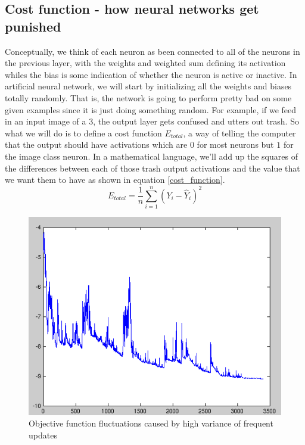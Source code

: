 \documentclass[master]{thesis-uestc}
\begin{document}
\subsection{Cost function - how neural networks get punished}
Conceptually, we think of each neuron as been connected to all of the neurons in the previous layer, with the weights and weighted sum defining its activation whiles the bias is some indication of whether the neuron is active or inactive. In artificial neural network, we will start by initializing all the weights and biases totally randomly. That is, the network is going to perform pretty bad on some given examples since it is just doing something random. For example, if we feed in an input image of a $3$, the output layer gets confused and utters out trash. So what we will do is to define a cost function $E_{total}$, a way of telling the computer that the output should have activations which are $0$ for most neurons but $1$ for the image class neuron. In a mathematical language, we'll add up the squares of the differences between each of those trash output activations and the value that we want them to have as shown in equation \ref{cost_function}.
\begin{equation}
    E_{total} = \frac{1}{n}\sum_{i=1}^{n} (Y_i - \hat{Y}_i)^2
    \label{cost_function}
\end{equation}

\begin{figure}[ht]
\includegraphics[width=5in]{pic/fluctuation.png}
\caption{Objective function fluctuations caused by high variance of frequent updates}
\label{SGD}
\end{figure}
\end{document}
